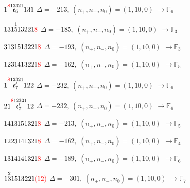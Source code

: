 \documentclass[10pt]{article}
\begin{document}
\smallskip

$1\overset{\textcolor{red}{8}12321}{\mathfrak{e}_6}131$ \quad $\Delta=-213,\; (n_+,n_-,n_0)=(1,10,0)$ \quad $\to \mathbb{F}_{6}$

\smallskip

$131\overset{1}{5}13221\textcolor{red}{8}$ \quad $\Delta=-185,\; (n_+,n_-,n_0)=(1,10,0)$ \quad $\to \mathbb{F}_{3}$

\smallskip

$3131513221\textcolor{red}{8}$ \quad $\Delta=-193,\; (n_+,n_-,n_0)=(1,10,0)$ \quad $\to \mathbb{F}_{3}$

\smallskip

$1231413221\textcolor{red}{8}$ \quad $\Delta=-162,\; (n_+,n_-,n_0)=(1,10,0)$ \quad $\to \mathbb{F}_{5}$

\smallskip

$1\overset{\textcolor{red}{8}12321}{\mathfrak{e}_7'}122$ \quad $\Delta=-232,\; (n_+,n_-,n_0)=(1,10,0)$ \quad $\to \mathbb{F}_{6}$

\smallskip

$21\overset{\textcolor{red}{8}12321}{\mathfrak{e}_7'}12$ \quad $\Delta=-232,\; (n_+,n_-,n_0)=(1,10,0)$ \quad $\to \mathbb{F}_{6}$

\smallskip

$1413151321\textcolor{red}{8}$ \quad $\Delta=-213,\; (n_+,n_-,n_0)=(1,10,0)$ \quad $\to \mathbb{F}_{5}$

\smallskip

$1223141321\textcolor{red}{8}$ \quad $\Delta=-162,\; (n_+,n_-,n_0)=(1,10,0)$ \quad $\to \mathbb{F}_{4}$

\smallskip

$1314141321\textcolor{red}{8}$ \quad $\Delta=-189,\; (n_+,n_-,n_0)=(1,10,0)$ \quad $\to \mathbb{F}_{6}$

\smallskip

$1\overset{2}{3}1513221\textcolor{red}{(12)}$ \quad $\Delta=-301,\; (n_+,n_-,n_0)=(1,10,0)$ \quad $\to \mathbb{F}_{7}$
\end{document}
